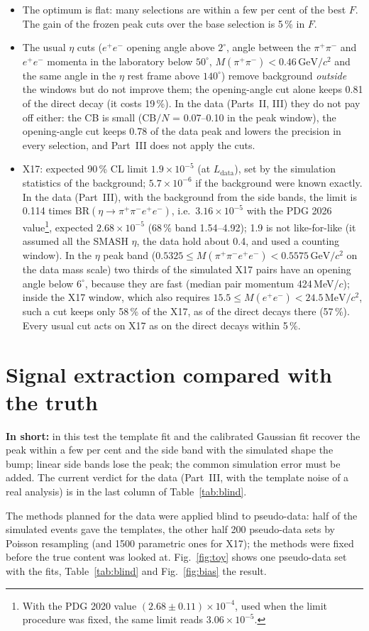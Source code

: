 \documentclass[11pt,a4paper]{article}
\newcommand{\ee}{\ensuremath{e^{+}e^{-}}\xspace}
\newcommand{\pipi}{\ensuremath{\pi^{+}\pi^{-}}\xspace}
\newcommand{\ppee}{\ensuremath{\pi^{+}\pi^{-}e^{+}e^{-}}\xspace}
\newcommand{\Mfour}{\ensuremath{M(\pi^{+}\pi^{-}e^{+}e^{-})}\xspace}
\newcommand{\Mee}{\ensuremath{M(e^{+}e^{-})}\xspace}
\newcommand{\Mpipi}{\ensuremath{M(\pi^{+}\pi^{-})}\xspace}
\newcommand{\GeVcc}{\ensuremath{\mathrm{GeV}/c^{2}}\xspace}
\newcommand{\MeVcc}{\ensuremath{\mathrm{MeV}/c^{2}}\xspace}
\newcommand{\Ldata}{\ensuremath{L_{\mathrm{data}}}\xspace}
\newcommand{\inshort}[1]{\par\noindent\colorbox{black!5}{\parbox{\dimexpr\linewidth-2\fboxsep\relax}{\textbf{In short:} #1}}\par}
\newcommand{\usualcuts}{\ee opening angle above $2^\circ$, angle between the \pipi and \ee momenta in the laboratory below
$50^\circ$, $\Mpipi<0.46$\,\GeVcc and the same angle in the $\eta$ rest frame above $140^\circ$}
\begin{document}
\begin{itemize}
\item The optimum is flat: many selections are within a few per cent of the best $F$. The gain of the frozen
      peak cuts over the base selection is 5\,\% in $F$.
\item The usual $\eta$ cuts (\usualcuts) remove background \emph{outside} the windows but do not improve them; the
      opening-angle cut alone keeps 0.81 of the direct decay (it costs 19\,\%). In the data (Parts~II, III) they do not pay off
      either: the CB is small (CB$/N$ = 0.07--0.10 in the peak window), the opening-angle cut keeps 0.78 of the data peak and
      lowers the precision in every selection, and Part~III does not apply the cuts.
\item X17: expected 90\,\% CL limit $1.9\times10^{-5}$ (at \Ldata), set by the simulation statistics of the
      background; $5.7\times10^{-6}$ if the background were known exactly. In the data (Part~III), with the background from
      the side bands, the limit is 0.114 times $\mathrm{BR}(\eta\to\ppee)$, i.e.\ $3.16\times10^{-5}$ with the PDG 2026
      value\footnote{\label{fn:x17pdg}With the PDG 2020 value $(2.68\pm0.11)\times10^{-4}$, used when the limit procedure
      was fixed, the same limit reads $3.06\times10^{-5}$.}, expected $2.68\times10^{-5}$ (68\,\% band 1.54--4.92); 1.9 is not
      like-for-like (it assumed all the SMASH $\eta$, the data hold about 0.4, and used a counting window). In the $\eta$ peak
      band ($0.5325\le\Mfour<0.5575$\,\GeVcc on the data mass scale) two thirds of the simulated X17 pairs have an opening angle below $6^\circ$, because they are fast (median pair
      momentum 424\,MeV/$c$); inside the X17 window, which also requires $15.5\le\Mee<24.5$\,\MeVcc, such a cut keeps only 58\,\%
      of the X17, as of the direct decays there (57\,\%). Every usual cut acts on X17 as on the direct decays within 5\,\%.
\end{itemize}

\section{Signal extraction compared with the truth}
\label{sec:ext}
\inshort{in this test the template fit and the calibrated Gaussian fit recover the peak within a few per cent and the side
band with the simulated shape the bump; linear side bands lose the peak; the common simulation error must be added. The
current verdict for the data (Part~III, with the template noise of a real analysis) is in the last column of
Table~\ref{tab:blind}.}
The methods planned for the data were applied blind to pseudo-data: half of the simulated events gave the templates,
the other half 200 pseudo-data sets by Poisson resampling (and 1500 parametric ones for X17); the methods were fixed
before the true content was looked at. Fig.~\ref{fig:toy} shows one pseudo-data set with the fits,
Table~\ref{tab:blind} and Fig.~\ref{fig:bias} the result.
\end{document}
